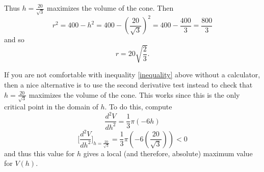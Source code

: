 \documentclass[handout,nooutcomes]{ximera}
\renewenvironment{freeResponse}{
\ifhandout\setbox0\vbox\bgroup\else
\begin{trivlist}\item[\hskip \labelsep\bfseries Solution:\hspace{2ex}]
\fi}
{\ifhandout\egroup\else
\end{trivlist}
\fi}
\newcommand{\dd}[2][]{\frac{d #1}{d #2}}
\newcommand{\eval}[1]{\bigg[ #1 \bigg]}
\begin{document}
\begin{problem}
\begin{freeResponse}
    Thus $h=\frac{20}{\sqrt{3}}$ maximizes the volume of the cone.
    Then $$r^2 = 400 - h^2 = 400 - \left( \frac{20}{\sqrt{3}} \right)^2 = 400 - \frac{400}{3} = \frac{800}{3}$$ and so $$ r = 20 \sqrt{\frac{2}{3}}. $$
		
    If you are not comfortable with inequality \eqref{inequality} above without a calculator, then a nice alternative is to use the second derivative test instead to check that $h=\frac{20}{\sqrt{3}}$ maximizes the volume of the cone.
    This works since this is the only critical point in the domain of $h$.
    To do this, compute
    $$ \dd[^2V]{h^2} = \frac{1}{3} \pi (-6h) $$
    $$ \eval{\dd[^2V]{h^2}}_{h=\frac{20}{\sqrt{3}}} = \frac{1}{3} \pi \left( -6 \left(\frac{20}{\sqrt{3}} \right) \right) < 0 $$
    and thus this value for $h$ gives a local (and therefore, absolute) maximum value for $V(h)$.  
  \end{freeResponse}
\end{problem}
\end{document}
